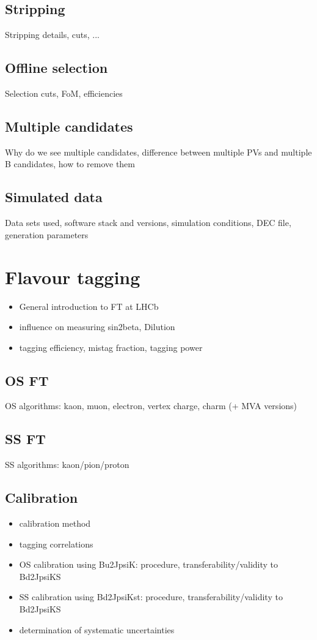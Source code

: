 \subsection{Stripping}
Stripping details, cuts, ...

\subsection{Offline selection}
Selection cuts, FoM, efficiencies

\subsection{Multiple candidates}
Why do we see multiple candidates, difference between multiple PVs and multiple B candidates, how to remove them

\subsection{Simulated data}
Data sets used, software stack and versions, simulation conditions, DEC file, generation parameters

\section{Flavour tagging}
\begin{itemize}
  \item General introduction to FT at LHCb
  \item influence on measuring sin2beta, Dilution
  \item tagging efficiency, mistag fraction, tagging power
\end{itemize}

\subsection{OS FT}
OS algorithms: kaon, muon, electron, vertex charge, charm (+ MVA versions)

\subsection{SS FT}
SS algorithms: kaon/pion/proton

\subsection{Calibration}
\begin{itemize}
  \item calibration method
  \item tagging correlations
  \item OS calibration using Bu2JpsiK: procedure, transferability/validity to Bd2JpsiKS
  \item SS calibration using Bd2JpsiKst: procedure, transferability/validity to Bd2JpsiKS
  \item determination of systematic uncertainties
\end{itemize}

